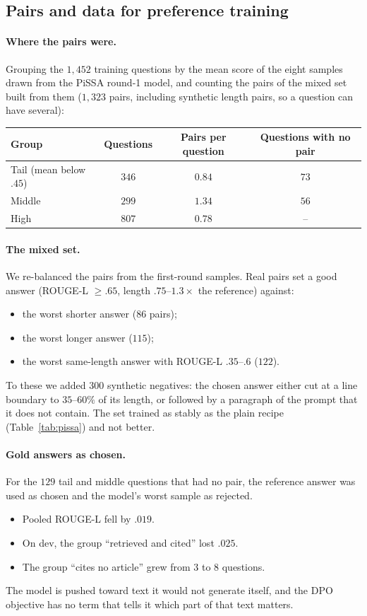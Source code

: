\documentclass[11pt,a4paper]{article}
\newcommand{\rl}{ROUGE-L}
\begin{document}
\subsection{Pairs and data for preference training}
\paragraph{Where the pairs were.} Grouping the $1{,}452$ training questions by the mean score of the eight samples drawn from the PiSSA round-1 model, and counting the pairs of the mixed set built from them ($1{,}323$ pairs, including synthetic length pairs, so a question can have several):

\begin{center}
\small
\begin{tabular}{@{}lccc@{}}
\toprule
Group & Questions & Pairs per question & Questions with no pair\\
\midrule
Tail (mean below $.45$) & $346$ & $0.84$ & $73$\\
Middle & $299$ & $1.34$ & $56$\\
High & $807$ & $0.78$ & --\\
\bottomrule
\end{tabular}
\end{center}

\paragraph{The mixed set.} We re-balanced the pairs from the first-round samples. Real pairs set a good answer (\rl{} $\ge.65$, length $.75$--$1.3\times$ the reference) against:
\begin{itemize}[leftmargin=*]
\item the worst shorter answer ($86$ pairs);
\item the worst longer answer ($115$);
\item the worst same-length answer with \rl{} $.35$--$.6$ ($122$).
\end{itemize}
To these we added $300$ synthetic negatives: the chosen answer either cut at a line boundary to $35$--$60\%$ of its length, or followed by a paragraph of the prompt that it does not contain. The set trained as stably as the plain recipe (Table~\ref{tab:pissa}) and not better.

\paragraph{Gold answers as chosen.} For the $129$ tail and middle questions that had no pair, the reference answer was used as chosen and the model's worst sample as rejected.
\begin{itemize}[leftmargin=*]
\item Pooled \rl{} fell by $.019$.
\item On dev, the group ``retrieved and cited'' lost $.025$.
\item The group ``cites no article'' grew from $3$ to $8$ questions.
\end{itemize}
The model is pushed toward text it would not generate itself, and the DPO objective has no term that tells it which part of that text matters.
\end{document}
